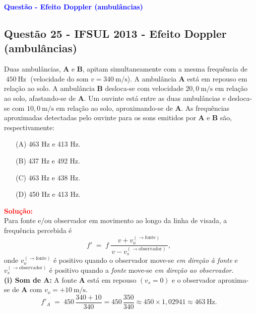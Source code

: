 \begin{flushleft}
\textbf{\textcolor{blue}{\Large Quest\~ao - Efeito Doppler (ambul\^ancias)}}\\
\noindent

\subsection{Quest\~ao 25 - IFSUL 2013 - Efeito Doppler (ambul\^ancias)}

Duas ambul\^ancias, \textbf{A} e \textbf{B}, apitam simultaneamente com a mesma frequ\^encia de \(\;450\ \text{Hz}\;\) (velocidade do som \(v=340\ \text{m/s}\)). A ambul\^ancia \textbf{A} est\'a em repouso em rela\c{c}\~ao ao solo. A ambul\^ancia \textbf{B} desloca-se com velocidade \(20{,}0\ \text{m/s}\) em rela\c{c}\~ao ao solo, afastando-se de \textbf{A}. Um ouvinte est\'a entre as duas ambul\^ancias e desloca-se com \(10{,}0\ \text{m/s}\) em rela\c{c}\~ao ao solo, aproximando-se de \textbf{A}. As frequ\^encias aproximadas detectadas pelo ouvinte para os sons emitidos por \textbf{A} e \textbf{B} s\~ao, respectivamente:

\begin{itemize}
\item[(A)] 463 Hz e 413 Hz.
\item[(B)] 437 Hz e 492 Hz.
\item[(C)] 463 Hz e 438 Hz.
\item[(D)] 450 Hz e 413 Hz.
\end{itemize}

\vspace{0.5cm}

\textcolor{red}{\textbf{Solu\c{c}\~ao:}}\\

Para fonte e/ou observador em movimento ao longo da linha de visada, a frequ\^encia percebida \'e
\[
f' \;=\; f\,\frac{v + v_o^{(\to \text{fonte})}}{\,v - v_s^{(\to \text{observador})}\,}\!,
\]
onde \(v_o^{(\to \text{fonte})}\) \'e positivo quando o observador move-se \emph{em dire\c{c}\~ao \`a fonte} e \(v_s^{(\to \text{observador})}\) \'e positivo quando a \emph{fonte} move-se \emph{em dire\c{c}\~ao ao observador}.\\[4pt]

\textbf{(i) Som de \(\mathbf{A}\):} A fonte \(\mathbf{A}\) est\'a em repouso \((v_s=0)\) e o observador aproxima-se de \(\mathbf{A}\) com \(v_o=+10\ \text{m/s}\).
\[
f'_A \;=\; 450\,\frac{340+10}{340}
= 450\,\frac{350}{340}
\approx 450\times 1{,}02941
\approx 463\ \text{Hz}.
\]


\end{flushleft}
